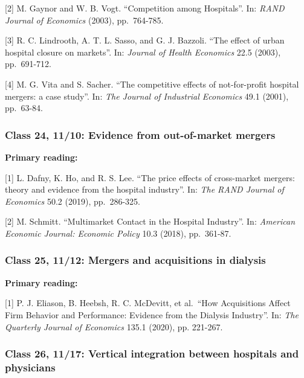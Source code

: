 \documentclass[11pt,]{article}
\begin{document}
{[}2{]} M. Gaynor and W. B. Vogt. ``Competition among Hospitals''. In:
\emph{RAND Journal of Economics} (2003), pp.~764-785.

{[}3{]} R. C. Lindrooth, A. T. L. Sasso, and G. J. Bazzoli. ``The effect
of urban hospital closure on markets''. In: \emph{Journal of Health
Economics} 22.5 (2003), pp.~691-712.

{[}4{]} M. G. Vita and S. Sacher. ``The competitive effects of
not-for-profit hospital mergers: a case study''. In: \emph{The Journal
of Industrial Economics} 49.1 (2001), pp.~63-84.

\hypertarget{class-24-1110-evidence-from-out-of-market-mergers}{%
\subsubsection{Class 24, 11/10: Evidence from out-of-market
mergers}\label{class-24-1110-evidence-from-out-of-market-mergers}}

\textbf{Primary reading:}

{[}1{]} L. Dafny, K. Ho, and R. S. Lee. ``The price effects of
cross-market mergers: theory and evidence from the hospital industry''.
In: \emph{The RAND Journal of Economics} 50.2 (2019), pp.~286-325.

{[}2{]} M. Schmitt. ``Multimarket Contact in the Hospital Industry''.
In: \emph{American Economic Journal: Economic Policy} 10.3 (2018),
pp.~361-87.

\hypertarget{class-25-1112-mergers-and-acquisitions-in-dialysis}{%
\subsubsection{Class 25, 11/12: Mergers and acquisitions in
dialysis}\label{class-25-1112-mergers-and-acquisitions-in-dialysis}}

\textbf{Primary reading:}

{[}1{]} P. J. Eliason, B. Heebsh, R. C. McDevitt, et al.~``How
Acquisitions Affect Firm Behavior and Performance: Evidence from the
Dialysis Industry''. In: \emph{The Quarterly Journal of Economics} 135.1
(2020), pp. 221-267.

\hypertarget{class-26-1117-vertical-integration-between-hospitals-and-physicians}{%
\subsubsection{Class 26, 11/17: Vertical integration between hospitals
and
physicians}\label{class-26-1117-vertical-integration-between-hospitals-and-physicians}}
\end{document}
